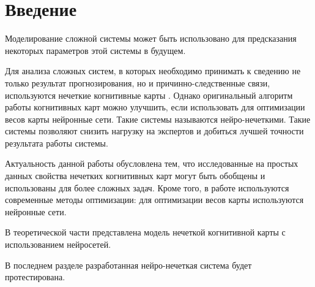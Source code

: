 \chapter*{Введение}
\label{sec:afterwords}

Моделирование сложной системы может быть использовано для предсказания
некоторых параметров этой системы в будущем.

Для анализа сложных систем, в которых необходимо принимать к сведению не только результат прогнозирования, но и причинно-следственные связи, используются нечеткие когнитивные карты \cite{osoba2019dags} \cite{kosko1986fuzzy}. Однако оригинальный алгоритм работы когнитивных карт можно улучшить, если использовать для оптимизации весов карты нейронные сети. Такие системы называются нейро-нечеткими. Такие системы позволяют снизить нагрузку на экспертов и добиться лучшей точности результата работы системы.

Актуальность данной работы обусловлена тем, что исследованные на простых
данных свойства нечетких когнитивных карт могут быть обобщены и использованы
для более сложных задач.
Кроме того, в работе используются современные методы оптимизации: для оптимизации весов карты используются нейронные сети.

В теоретической части представлена модель нечеткой когнитивной карты с использованием
нейросетей.

В последнем разделе разработанная нейро-нечеткая система будет протестирована.